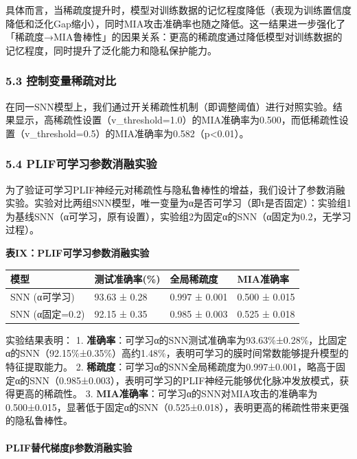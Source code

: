 \documentclass[
]{article}
\begin{document}
具体而言，当稀疏度提升时，模型对训练数据的记忆程度降低（表现为训练置信度降低和泛化Gap缩小），同时MIA攻击准确率也随之降低。这一结果进一步强化了「稀疏度→MIA鲁棒性」的因果关系：更高的稀疏度通过降低模型对训练数据的记忆程度，同时提升了泛化能力和隐私保护能力。

\subsubsection{5.3
控制变量稀疏对比}\label{ux63a7ux5236ux53d8ux91cfux7a00ux758fux5bf9ux6bd4}

在同一SNN模型上，我们通过开关稀疏性机制（即调整阈值）进行对照实验。结果显示，高稀疏性设置（v\_threshold=1.0）的MIA准确率为0.500，而低稀疏性设置（v\_threshold=0.5）的MIA准确率为0.582（p\textless0.01）。

\subsubsection{5.4
PLIF可学习参数消融实验}\label{plifux53efux5b66ux4e60ux53c2ux6570ux6d88ux878dux5b9eux9a8c}

为了验证可学习PLIF神经元对稀疏性与隐私鲁棒性的增益，我们设计了参数消融实验。实验对比两组SNN模型，唯一变量为α是否可学习（即τ是否固定）：实验组1为基线SNN（α可学习，原有设置），实验组2为固定α的SNN（α固定为0.2，无学习过程）。

\textbf{表IX：PLIF可学习参数消融实验}

\begin{longtable}[]{@{}llll@{}}
\toprule\noalign{}
模型 & 测试准确率(\%) & 全局稀疏度 & MIA准确率 \\
\midrule\noalign{}
\endhead
\bottomrule\noalign{}
\endlastfoot
SNN (α可学习) & 93.63 ± 0.28 & 0.997 ± 0.001 & 0.500 ± 0.015 \\
SNN (α固定=0.2) & 92.15 ± 0.35 & 0.985 ± 0.003 & 0.525 ± 0.018 \\
\end{longtable}

实验结果表明： 1.
\textbf{准确率}：可学习α的SNN测试准确率为93.63\%±0.28\%，比固定α的SNN（92.15\%±0.35\%）高约1.48\%，表明可学习的膜时间常数能够提升模型的特征提取能力。
2.
\textbf{稀疏度}：可学习α的SNN全局稀疏度为0.997±0.001，略高于固定α的SNN（0.985±0.003），表明可学习的PLIF神经元能够优化脉冲发放模式，获得更高的稀疏性。
3.
\textbf{MIA准确率}：可学习α的SNN对MIA攻击的准确率为0.500±0.015，显著低于固定α的SNN（0.525±0.018），表明更高的稀疏性带来更强的隐私鲁棒性。

\paragraph{PLIF替代梯度β参数消融实验}\label{plifux66ffux4ee3ux68afux5ea6ux3b2ux53c2ux6570ux6d88ux878dux5b9eux9a8c}
\end{document}
